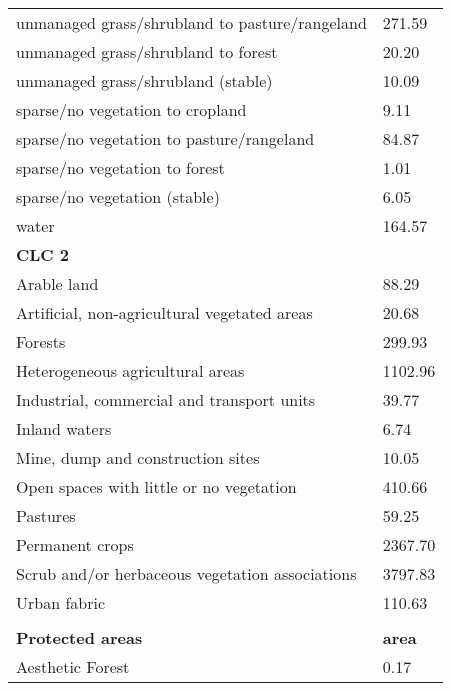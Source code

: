 \begin{longtable}{ll}
unmanaged grass/shrubland to pasture/rangeland     & 271.59           \\
unmanaged grass/shrubland to forest                & 20.20            \\
unmanaged grass/shrubland (stable)                 & 10.09            \\
sparse/no vegetation to cropland                   & 9.11             \\
sparse/no vegetation to pasture/rangeland          & 84.87            \\
sparse/no vegetation to forest                     & 1.01             \\
sparse/no vegetation (stable)                      & 6.05             \\
water                                              & 164.57           \\
\textbf{CLC 2}                                     &                  \\
Arable land                                        & 88.29            \\
Artificial, non-agricultural vegetated areas       & 20.68            \\
Forests                                            & 299.93           \\
Heterogeneous agricultural areas                   & 1102.96          \\
Industrial, commercial and transport units         & 39.77            \\
Inland waters                                      & 6.74             \\
Mine, dump and construction sites                  & 10.05            \\
Open spaces with little or no vegetation           & 410.66           \\
Pastures                                           & 59.25            \\
Permanent crops                                    & 2367.70          \\
Scrub and/or herbaceous vegetation associations    & 3797.83          \\
Urban fabric                                       & 110.63           \\
                                                   &                  \\
\textbf{Protected areas}                           & \textbf{area}    \\
Aesthetic Forest                                   & 0.17             \\

\end{longtable}

